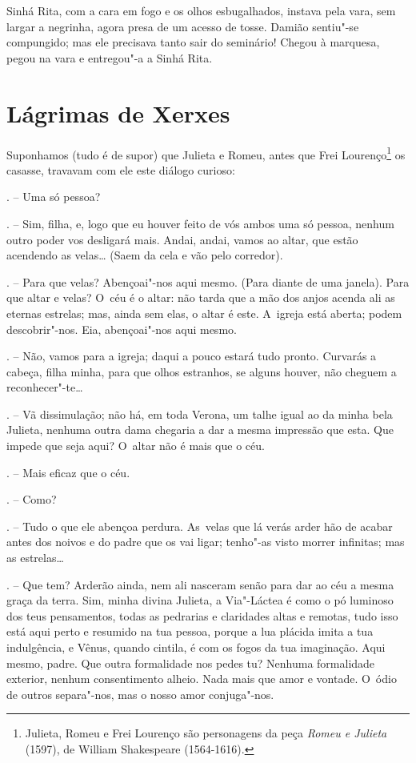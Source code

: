 Sinhá Rita, com a cara em fogo e os olhos esbugalhados, instava pela
vara, sem largar a negrinha, agora presa de um acesso de tosse. Damião
sentiu"-se compungido; mas ele precisava tanto sair do seminário! Chegou
à marquesa, pegou na vara e entregou"-a a Sinhá Rita.

\chapter{Lágrimas de Xerxes}

Suponhamos (tudo é de supor) que Julieta e Romeu, antes que Frei
Lourenço\footnote{Julieta, Romeu e Frei Lourenço são personagens da peça
  \emph{Romeu e Julieta} (1597), de William Shakespeare (1564-1616).} os
casasse, travavam com ele este diálogo curioso:

\begin{Parskip}
. -- Uma só pessoa?

. -- Sim, filha, e, logo que eu houver feito de vós ambos
uma só pessoa, nenhum outro poder vos desligará mais. Andai, andai,
vamos ao altar, que estão acendendo as velas\ldots{} (Saem da cela e vão pelo
corredor).

. -- Para que velas? Abençoai"-nos aqui mesmo. (Para diante de uma
janela). Para que altar e velas? O~céu é o altar: não tarda que a mão
dos anjos acenda ali as eternas estrelas; mas, ainda sem elas, o altar é
este. A~igreja está aberta; podem descobrir"-nos. Eia, abençoai"-nos aqui
mesmo.

. -- Não, vamos para a igreja; daqui a pouco estará tudo
pronto. Curvarás a cabeça, filha minha, para que olhos estranhos, se
alguns houver, não cheguem a reconhecer"-te\ldots{}

. -- Vã dissimulação; não há, em toda Verona, um talhe igual ao da
minha bela Julieta, nenhuma outra dama chegaria a dar a mesma impressão
que esta. Que impede que seja aqui? O~altar não é mais que o céu.

. -- Mais eficaz que o céu.

. -- Como?

. -- Tudo o que ele abençoa perdura. As~velas que lá verás
arder hão de acabar antes dos noivos e do padre que os vai ligar;
tenho"-as visto morrer infinitas; mas as estrelas\ldots{}

. -- Que tem? Arderão ainda, nem ali nasceram senão para dar ao céu
a mesma graça da terra. Sim, minha divina Julieta, a Via"-Láctea é como o
pó luminoso dos teus pensamentos, todas as pedrarias e claridades altas
e remotas, tudo isso está aqui perto e resumido na tua pessoa, porque a
lua plácida imita a tua indulgência, e Vênus, quando cintila, é com os
fogos da tua imaginação. Aqui mesmo, padre. Que outra formalidade nos
pedes tu? Nenhuma formalidade exterior, nenhum consentimento alheio.
Nada mais que amor e vontade. O~ódio de outros separa"-nos, mas o nosso
amor conjuga"-nos.


\end{Parskip}
